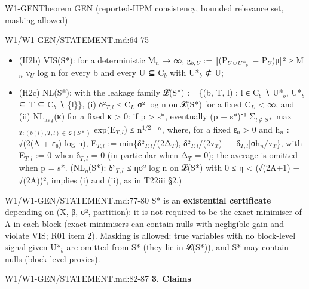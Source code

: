 \begin{card}{W1-GEN}{Theorem GEN (reported-HPM consistency, bounded relevance set, masking allowed)}
\begin{stmt}{W1/W1-GEN/STATEMENT.md:64-75}
\begin{itemize}
\item (H2b) VIS(S*): for a deterministic M$_{n}$ → ∞, g$_{b,U}$ := ‖(P$_{U\cup U*_b}$ − P$_{U}$)μ‖² ≥ M$_{n}$ v$_{U}$ log n for every b and every
U ⊆ C$_{b}$ with U*$_{b}$ ⊄ U;
\item (H2c) NL(S*): with the leakage family 𝓛(S*) := \{(b, T, l) : l ∈ C$_{b}$ ∖ U*$_{b}$, U*$_{b}$ ⊆ T ⊆ C$_{b}$ ∖ \{l\}\},
(i) δ²$_{T,l}$ ≤ C$_{L}$ σ² log n on 𝓛(S*) for a fixed C$_{L}$ < ∞, and
(ii) NL$_{\mathrm{avg}}$(κ) for a fixed κ > 0: if p > s*, eventually
(p − s*)⁻¹ Σ$_{l\notin S*}$ max$_{T:(b(l),T,l)\in\mathcal{L}(S*)}$ exp(E$_{T,l}$) ≤ n$^{1/2-\kappa}$, where, for a fixed ε₀ > 0 and
h$_{n}$ := √(2(A + ε₀) log n), E$_{T,l}$ := min\{δ²$_{T,l}$/(2Δ$_{T}$), δ²$_{T,l}$/(2v$_{T}$) + |δ$_{T,l}$|σh$_{n}$/v$_{T}$\}, with E$_{T,l}$ := 0
when δ$_{T,l}$ = 0 (in particular when Δ$_{T}$ = 0); the average is omitted when p = s*.
(NL$_{\eta}$(S*): δ²$_{T,l}$ ≤ ησ² log n on 𝓛(S*) with 0 ≤ η < (√(2A+1) − √(2A))², implies (i) and (ii), as in T22iii §2.)
\end{itemize}
\end{stmt}
\begin{stmt}{W1/W1-GEN/STATEMENT.md:77-80}
S* is an \textbf{existential certificate} depending on (X, β, σ², partition): it is not required to be the exact minimiser
of Λ in each block (exact minimisers can contain nulls with negligible gain and violate VIS; R01 item 2). Masking is
allowed: true variables with no block-level signal given U*$_{b}$ are omitted from S* (they lie in 𝓛(S*)), and S* may
contain nulls (block-level proxies).
\end{stmt}
\begin{stmt}{W1/W1-GEN/STATEMENT.md:82-87}
\textbf{3. Claims}


\end{stmt}
\end{card}
